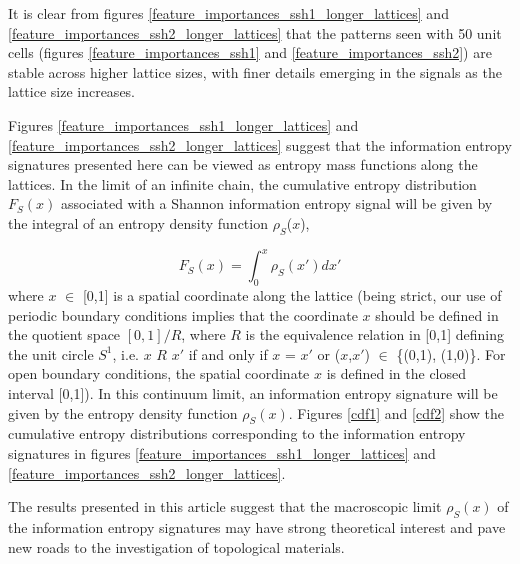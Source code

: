 \documentclass[fleqn,10pt]{wlscirep}
\begin{document}
It is clear from figures \ref{feature_importances_ssh1_longer_lattices} and \ref{feature_importances_ssh2_longer_lattices} that the patterns seen with 50 unit cells (figures \ref{feature_importances_ssh1} and \ref{feature_importances_ssh2}) are stable across higher lattice sizes, with finer details emerging in the signals as the lattice size increases.

Figures \ref{feature_importances_ssh1_longer_lattices} and \ref{feature_importances_ssh2_longer_lattices} suggest that the information entropy signatures presented here can be viewed as entropy mass functions along the lattices. In the limit of an infinite chain, the cumulative entropy distribution $F_S(x)$ associated with a Shannon information entropy signal will be given by the integral of an entropy density function $\rho_S$($x$),

\begin{equation}
\label{entropy_dens}
F_S(x) = \int_{0}^x\rho_S(x')dx'
\end{equation}
where $x$ $\in$ [0,1] is a spatial coordinate along the lattice (being strict, our use of periodic boundary conditions implies that the coordinate $x$ should be defined in the quotient space $[0,1]/R$, where $R$ is the equivalence relation in [0,1] defining the unit circle $S^1$, i.e. $x$ $R$ $x'$ if and only if $x$ = $x'$ or ($x$,$x'$) $\in$ \{(0,1), (1,0)\}. For open boundary conditions, the spatial coordinate $x$ is defined in the closed interval [0,1]). In this continuum limit, an information entropy signature will be given by the entropy density function $\rho_S(x)$. Figures \ref{cdf1} and \ref{cdf2} show the cumulative entropy distributions corresponding to the information entropy signatures in figures \ref{feature_importances_ssh1_longer_lattices} and \ref{feature_importances_ssh2_longer_lattices}.

The results presented in this article suggest that the macroscopic limit $\rho_S(x)$ of the information entropy signatures may have strong theoretical interest and pave new roads to the investigation of topological materials.
\end{document}
